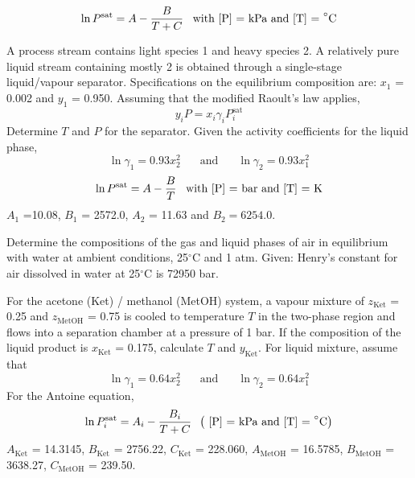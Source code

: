 \begin{MyTutorial}{}
\begin{problem}
       \begin{displaymath}
        \ln P^{\text{sat}} = A - \displaystyle\frac{B}{T + C}\;\;\;\text{with [P] = kPa and [T] = }^{\circ}\text{C}
       \end{displaymath} 
  \end{problem}
%
  \begin{problem}\label{Chapter:VLE:Problem:05} %
     A process stream contains light species 1 and heavy species 2. A relatively pure liquid stream containing mostly 2 is obtained through a single-stage liquid/vapour separator. Specifications on the equilibrium composition are: $x_{1}$ = 0.002 and $y_{1}$ = 0.950. Assuming that the modified Raoult's law applies, 
     \begin{displaymath}
       y_{i} P = x_{i}\gamma_{i}P_{i}^{\text{sat}}
     \end{displaymath} 
     Determine $T$ and $P$ for the separator. Given the activity coefficients for the liquid phase,
     \begin{displaymath}
        \ln\gamma_{1} = 0.93x_{2}^{2} \;\;\;\;\;\text{ and }\;\;\;\;\;\ln\gamma_{2}=0.93x_{1}^{2}
     \end{displaymath}
     \begin{displaymath}
        \ln P^{\text{sat}} = A - \displaystyle\frac{B}{T}\;\;\;\text{with [P] = bar and [T] = K}
     \end{displaymath} 
     $A_{1}$ =10.08, $B_{1}$ = 2572.0, $A_{2}$ = 11.63 and $B_{2}=6254.0$.
  \end{problem}
%
  \begin{problem}\label{Chapter:VLE:Problem:06} %
     Determine the compositions of the gas and liquid phases of air in equilibrium with water at ambient conditions, 25$^{\circ}$C and 1 atm. Given: Henry's constant for air dissolved in water at 25$^{\circ}$C is 72950 bar. 
  \end{problem}
%
  \begin{problem}\label{Chapter:VLE:Problem:07}\citep{SmithVanNess_Book} %
     For the acetone (Ket) / methanol (MetOH) system, a vapour mixture of $z_{\text{Ket}}$ = 0.25 and $z_{\text{MetOH}}$ = 0.75 is cooled to temperature $T$ in the two-phase region and flows into a separation chamber at a pressure of 1 bar. If the composition of the liquid product is $x_{\text{Ket}}$ = 0.175, calculate $T$  and $y_{\text{Ket}}$. For liquid mixture, assume that
     \begin{displaymath}
        \ln\gamma_{1} = 0.64x_{2}^{2} \;\;\;\;\;\text{ and }\;\;\;\;\;\ln\gamma_{2}=0.64x_{1}^{2}
     \end{displaymath}
     For the Antoine equation, 
     \begin{displaymath}
       \ln P_{i}^{\text{sat}} = A_{i} - \displaystyle\frac{B_{i}}{T + C} \;\;\left(\text{ [P] = kPa and [T] = }^{\circ}\text{C}\right)
     \end{displaymath}
     $A_{\text{Ket}}$ = 14.3145, $B_{\text{Ket}}$ = 2756.22, $C_{\text{Ket}}$ = 228.060, $A_{\text{MetOH}}$ = 16.5785, $B_{\text{MetOH}}$ = 3638.27, $C_{\text{MetOH}}$ = 239.50.
  \end{problem}
%
\end{MyTutorial}
